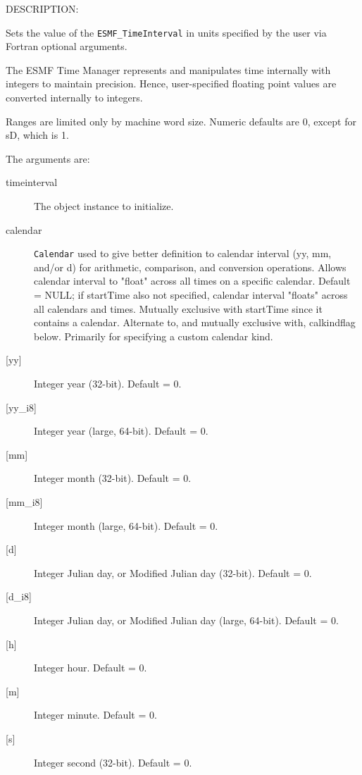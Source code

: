 {\sf DESCRIPTION:\\ }


       Sets the value of the {\tt ESMF\_TimeInterval} in units specified by
       the user via Fortran optional arguments.
  
       The ESMF Time Manager represents and manipulates time internally with
       integers to maintain precision.  Hence, user-specified floating point
       values are converted internally to integers.
  
       Ranges are limited only by machine word size.  Numeric defaults are 0,
       except for sD, which is 1.
  
       The arguments are:
       \begin{description}
       \item[timeinterval]
            The object instance to initialize.
       \item[calendar]
            {\tt Calendar} used to give better definition to 
            calendar interval (yy, mm, and/or d) for arithmetic, comparison, 
            and conversion operations.  Allows calendar interval to "float" 
            across all times on a specific calendar.  Default = NULL; 
            if startTime also not specified, calendar interval "floats" across 
            all calendars and times.  Mutually exclusive with startTime since 
            it contains a calendar.  Alternate to, and mutually exclusive with, 
            calkindflag below.  Primarily for specifying a custom calendar kind.
       \item[{[yy]}]
            Integer year (32-bit).  Default = 0.
       \item[{[yy\_i8]}]
            Integer year (large, 64-bit).  Default = 0.
       \item[{[mm]}]
            Integer month (32-bit).  Default = 0.
       \item[{[mm\_i8]}]
            Integer month (large, 64-bit).  Default = 0.
       \item[{[d]}]
            Integer Julian day, or Modified Julian day (32-bit).  Default = 0.
       \item[{[d\_i8]}]
            Integer Julian day, or Modified Julian day (large, 64-bit).
            Default = 0.
       \item[{[h]}]
            Integer hour.  Default = 0.
       \item[{[m]}]
            Integer minute.  Default = 0.
       \item[{[s]}]
            Integer second (32-bit).  Default = 0.

\end{description}
